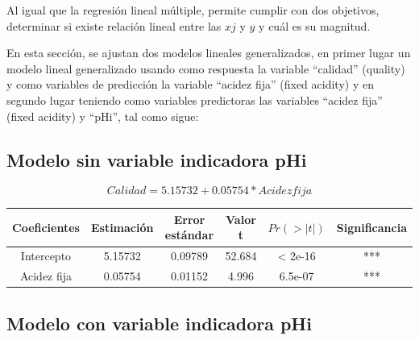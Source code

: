 \documentclass[
]{article}
\newenvironment{Shaded}{\begin{snugshade}}{\end{snugshade}}
\newcommand{\DataTypeTok}[1]{\textcolor[rgb]{0.13,0.29,0.53}{#1}}
\newcommand{\KeywordTok}[1]{\textcolor[rgb]{0.13,0.29,0.53}{\textbf{#1}}}
\newcommand{\NormalTok}[1]{#1}
\newcommand{\OperatorTok}[1]{\textcolor[rgb]{0.81,0.36,0.00}{\textbf{#1}}}
\newcommand{\StringTok}[1]{\textcolor[rgb]{0.31,0.60,0.02}{#1}}
\begin{document}
Al igual que la regresión lineal múltiple, permite cumplir con dos
objetivos, determinar si existe relación lineal entre las \(xj\) y \(y\)
y cuál es su magnitud.

En esta sección, se ajustan dos modelos lineales generalizados, en
primer lugar un modelo lineal generalizado usando como respuesta la
variable ``calidad'' (quality) y como variables de predicción la
variable ``acidez fija'' (fixed acidity) y en segundo lugar teniendo
como variables predictoras las variables ``acidez fija'' (fixed acidity)
y ``pHi'', tal como sigue:

\hypertarget{modelo-sin-variable-indicadora-phi}{%
\subsection{Modelo sin variable indicadora
pHi}\label{modelo-sin-variable-indicadora-phi}}

\begin{Shaded}
\end{Shaded}

\[Calidad=5.15732+0.05754*Acidezfija \]

\begin{longtable}[]{@{}cccccc@{}}
\toprule
Coeficientes & Estimación & Error estándar & Valor t & \(Pr(>|t|)\) &
Significancia\tabularnewline
\midrule
\endhead
Intercepto & 5.15732 & 0.09789 & 52.684 & \textless{} 2e-16 &
***\tabularnewline
Acidez fija & 0.05754 & 0.01152 & 4.996 & 6.5e-07 & ***\tabularnewline
\bottomrule
\end{longtable}

\hypertarget{modelo-con-variable-indicadora-phi}{%
\subsection{Modelo con variable indicadora
pHi}\label{modelo-con-variable-indicadora-phi}}

\begin{Shaded}
\end{Shaded}
\end{document}
